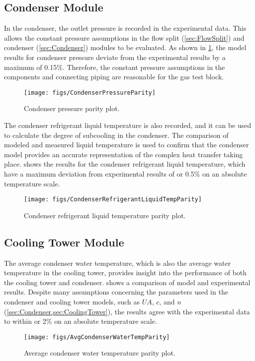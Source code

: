 \subsection{Condenser Module} \label{sec:condresult}
In the condenser, the outlet pressure is recorded in the experimental data.
This allows the constant pressure assumptions in the flow split (\cref{sec:FlowSplit})
and condenser (\cref{sec:Condenser}) modules to be evaluated.
As shown in \cref{fig:CondPressParity}, the model results for condenser pressure
deviate from the experimental results by a maximum of 0.15\%.
Therefore, the constant pressure assumptions in the components
and connecting piping are reasonable for the  gas test block.
\begin{figure}[tbp]
  \centering
  \texttt{[image: figs/CondenserPressureParity]}
  \caption{Condenser pressure parity plot.}
  \label{fig:CondPressParity}
\end{figure}

The condenser refrigerant liquid temperature is also recorded,
and it can be used to calculate the degree of subcooling in the condenser.
The comparison of modeled and measured liquid temperature is 
used to confirm that the condenser model provides an
accurate representation of the complex heat transfer taking place.
 shows the results for the condenser
refrigerant liquid temperature, which have a maximum deviation from
experimental results of  or 0.5\% on an absolute temperature scale.
\begin{figure}[tbp]
  \centering
  \texttt{[image: figs/CondenserRefrigerantLiquidTempParity]}
  \caption{Condenser refrigerant liquid temperature parity plot.}
  \label{fig:CondRefLiqTempParity}
\end{figure}

\subsection{Cooling Tower Module}
The average condenser water temperature, which is also the 
average water temperature in the cooling tower, provides insight
into the performance of both the cooling tower and condenser.
 shows a comparison of model and
experimental results.
Despite many assumptions concerning the parameters used in the condenser
and cooling tower models, such as $UA$, $c$, and $n$ (\cref{sec:Condenser,sec:CoolingTower}),
the results agree with the experimental data to within 
or 2\% on an absolute temperature scale.
\begin{figure}[tbp]
  \centering
  \texttt{[image: figs/AvgCondenserWaterTempParity]}
  \caption{Average condenser water temperature parity plot.}
  \label{fig:AvgCondWatTempParity}
\end{figure}

